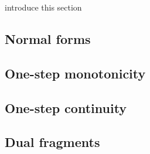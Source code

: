 \btbs
\item
introduce this section
\etbs


\subsection{Normal forms}\label{subsec:normalforms}

\subsection{One-step monotonicity}\label{subsec:one-stepmonot}

\subsection{One-step continuity}\label{subsec:one-stepcont}

\subsection{Dual fragments}\label{subsec:one-stepduals}

